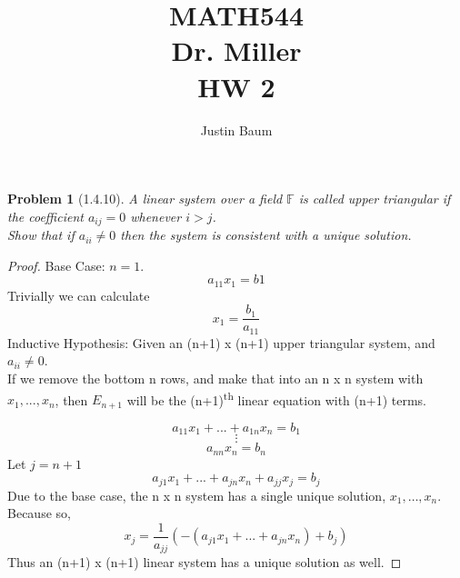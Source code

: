 \documentclass[12pt]{article}   %
\title{MATH544 \\ Dr. Miller \\ HW 2}
\author{Justin Baum}
\newcommand{\F}{\mathbb{F}} %
\newtheorem{theorem}{Problem}
\begin{document}
\maketitle
\begin{theorem}[1.4.10]
A linear system over a field $\F$ is called upper triangular if the coefficient $a_{ij} = 0$ whenever $i > j$.\\
Show that if $a_{ii} \neq 0$ then the system is consistent with a unique solution.
\end{theorem}
\begin{proof}
Base Case: $n=1$.\\
\[a_{11}x_1=b1\]
Trivially we can calculate
\[x_1=\frac{b_1}{a_{11}}\]
Inductive Hypothesis:
Given an (n+1) x (n+1) upper triangular system, and $a_{ii} \neq 0$.\\
If we remove the bottom n rows, and make that into an n x n system with $x_1,...,x_n$, then $E_{n+1}$ will be the (n+1)\textsuperscript{th} linear equation with (n+1) terms.

\[a_{11}x_1+...+a_{1n}x_n=b_1\]
\[\vdots\]
\[a_{nn}x_n = b_n\]
Let $j = n+1$
\[a_{j1}x_1+...+a_{jn}x_{n}+a_{jj}x_{j}=b_{j}\] Due to the base case, the n x n system has a single unique solution, $x_1,\dots,x_n$. Because so,
\[x_{j}=\frac{1}{a_{jj}}\left ( - (a_{j1}x_1+...+a_{jn}x_n) + b_{j}\right )\]
Thus an (n+1) x (n+1) linear system has a unique solution as well.
\end{proof}
\end{document}
